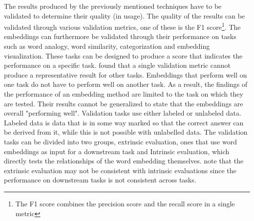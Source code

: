 \documentclass[../../Thesis.tex]{subfiles}
\begin{document}
The results produced by the previously mentioned techniques have to be validated to determine their quality (in usage). The quality of the results can be validated through various validation metrics, one of these is the F1 score\footnote{The F1 score combines the precision score and the recall score in a single metric}. The embeddings can furthermore be validated through their performance on tasks such as word analogy, word similarity, categorization and embedding visualization. These tasks can be designed to produce a score that indicates the performance on a specific task. \citet{schnabel2015evaluation} found that a single validation metric cannot produce a representative result for other tasks. Embeddings that perform well on one task do not have to perform well on another task. As a result, the findings of the performance of an embedding method are limited to the task on which they are tested. Their results cannot be generalized to state that the embeddings are overall "performing well". Validation tasks use either labeled or unlabeled data. Labeled data is data that is in some way marked so that the correct answer can be derived from it, while this is not possible with unlabelled data. The validation tasks can be divided into two groups, extrinsic evaluation, ones that use word embeddings as input for a downstream task and Intrinsic evaluation, which directly tests the relationships of the word embedding themselves. \citet{schnabel2015evaluation} note that the extrinsic evaluation may not be consistent with intrinsic evaluations since the performance on downstream tasks is not consistent across tasks.
\end{document}
